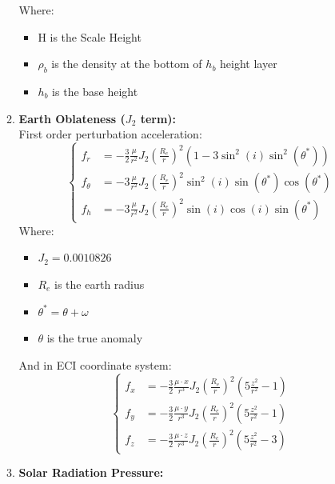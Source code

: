 \documentclass[11pt, a4paper]{article}
\begin{document}
\begin{itemize}
\begin{enumerate}
        Where:
        \begin{itemize}
            \item H is the Scale Height
            \item $\rho_b$ is the density at the bottom of $h_b$ height layer
            \item $h_b$ is the base height
        \end{itemize}
        \item \textbf{\large Earth Oblateness ($J_2$ term):}\\
        First order perturbation acceleration:
        \begin{equation}
        \begin{cases}
            f_r &=\displaystyle -\frac{3}{2}\frac{\mu}{r^2}J_2\left(\frac{R_e}{r}\right)^2\left(1-3\sin^2(i)\sin^2(\theta^*)\right)\\
            f_\theta &=\displaystyle -3\frac{\mu}{r^2}J_2\left(\frac{R_e}{r}\right)^2\sin^2(i)\sin(\theta^*)\cos(\theta^*)\\
            f_h &=\displaystyle -3\frac{\mu}{r^2}J_2\left(\frac{R_e}{r}\right)^2\sin(i)\cos(i)\sin(\theta^*)
        \end{cases}
        \end{equation}
        \newpage
        Where:
        \begin{itemize}
            \item $J_2 = 0.0010826$ 
            \item $R_e$ is the earth radius
            \item $\theta^* = \theta+\omega$
            \item $\theta$ is the true anomaly
        \end{itemize}
        And in ECI coordinate system:
        \begin{equation}
        \begin{cases}
            f_x &=\displaystyle  -\frac{3}{2}\frac{\mu\cdot x}{r^3}J_2\left(\frac{R_e}{r}\right)^2\left(5\frac{z^2}{r^2}-1\right)\\
            f_y &=\displaystyle -\frac{3}{2}\frac{\mu\cdot y}{r^3}J_2\left(\frac{R_e}{r}\right)^2\left(5\frac{z^2}{r^2}-1\right)\\
            f_z &=\displaystyle -\frac{3}{2}\frac{\mu\cdot z}{r^3}J_2\left(\frac{R_e}{r}\right)^2\left(5\frac{z^2}{r^2}-3\right)
        \end{cases}
        \end{equation}
        \item \textbf{\large Solar Radiation Pressure:}\\

\end{enumerate}
\end{itemize}
\end{document}
